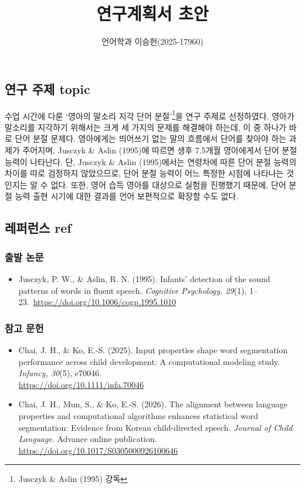 \documentclass{article}
\title{\textbf{연구계획서 초안}} %
\author{언어학과 이승헌(2025\mbox{-}17960)} %
\date{}
\newcommand{\englabel}[1]{{\normalfont\englabelfont\small #1}}
\begin{document}
\maketitle

\subsection{연구 주제 \englabel{topic}}
수업 시간에 다룬 `영아의 말소리 지각 \textendash{} 단어 분절'\footnote{Jusczyk \& Aslin (1995) 강독}을 연구 주제로 선정하였다. 영아가 말소리를 지각하기 위해서는 크게 세 가지의 문제를 해결해야 하는데, 이 중 하나가 바로 단어 분절 문제다. 영아에게는 띄어쓰기 없는 말의 흐름에서 단어를 찾아야 하는 과제가 주어지며, Jusczyk \& Aslin (1995)에 따르면 생후 7.5개월 영아에게서 단어 분절 능력이 나타난다. 단, Jusczyk \& Aslin (1995)에서는 연령차에 따른 단어 분절 능력의 차이를 따로 검정하지 않았으므로, 단어 분절 능력이 어느 특정한 시점에 나타나는 것인지는 알 수 없다. 또한, 영어 습득 영아를 대상으로 실험을 진행했기 때문에, 단어 분절 능력 출현 시기에 대한 결과를 언어 보편적으로 확장할 수도 없다. 

\smallskip
\subsection{레퍼런스 \englabel{ref}} 
\subsubsection{출발 논문} 
\begin{itemize}
  \item Jusczyk, P. W., \& Aslin, R. N. (1995). Infants' detection of the sound patterns of words in fluent speech. \textit{Cognitive Psychology, 29}(1), 1--23.\ \url{https://doi.org/10.1006/cogp.1995.1010}
\end{itemize}

\vspace{-2ex}
\subsubsection{참고 문헌}
\begin{itemize}
    \item Chai, J. H., \& Ko, E.-S. (2025). Input properties shape word segmentation performance across child development: A computational modeling study. \textit{Infancy, 30}(5), e70046.\ \\ \url{https://doi.org/10.1111/infa.70046} %
    \item Chai, J. H., Mun, S., \& Ko, E.-S. (2026). The alignment between language properties and computational algorithms enhances statistical word segmentation: Evidence from Korean child-directed speech. \textit{Journal of Child Language}. Advance online publication.\ \\ \url{https://doi.org/10.1017/S0305000926100646}
\end{itemize}
\end{document}
